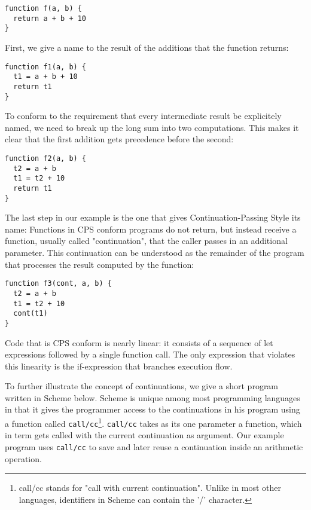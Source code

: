 \documentclass[11pt]{report}
\begin{document}
\begin{lstlisting}
function f(a, b) {
  return a + b + 10
}
\end{lstlisting}

First, we give a name to the result of the additions that the function returns:

\begin{lstlisting}
function f1(a, b) {
  t1 = a + b + 10
  return t1
}
\end{lstlisting}

To conform to the requirement that every intermediate result be explicitely named, we need to break up the long sum into two computations. This makes it clear that the first addition gets precedence before the second:

\begin{lstlisting}
function f2(a, b) {
  t2 = a + b
  t1 = t2 + 10
  return t1
}
\end{lstlisting}

The last step in our example is the one that gives Continuation-Passing Style its name: Functions in CPS conform programs do not return, but instead receive a function, usually called "continuation", that the caller passes in an additional parameter. This continuation can be understood as the remainder of the program that processes the result computed by the function:

\begin{lstlisting}
function f3(cont, a, b) {
  t2 = a + b
  t1 = t2 + 10
  cont(t1)
}
\end{lstlisting}

Code that is CPS conform is nearly linear: it consists of a sequence of let expressions followed by a single function call. The only expression that violates this linearity is the if-expression that branches execution flow.

To further illustrate the concept of continuations, we give a short program written in Scheme below. Scheme is unique among most programming languages in that it gives the programmer access to the continuations in his program using a function called \texttt{call/cc}\footnote{call/cc stands for "call with current continuation". Unlike in most other languages, identifiers in Scheme can contain the '/' character.}. \texttt{call/cc} takes as its one parameter a function, which in term gets called with the current continuation as argument. Our example program uses \texttt{call/cc} to save and later reuse a continuation inside an arithmetic operation.
\end{document}
